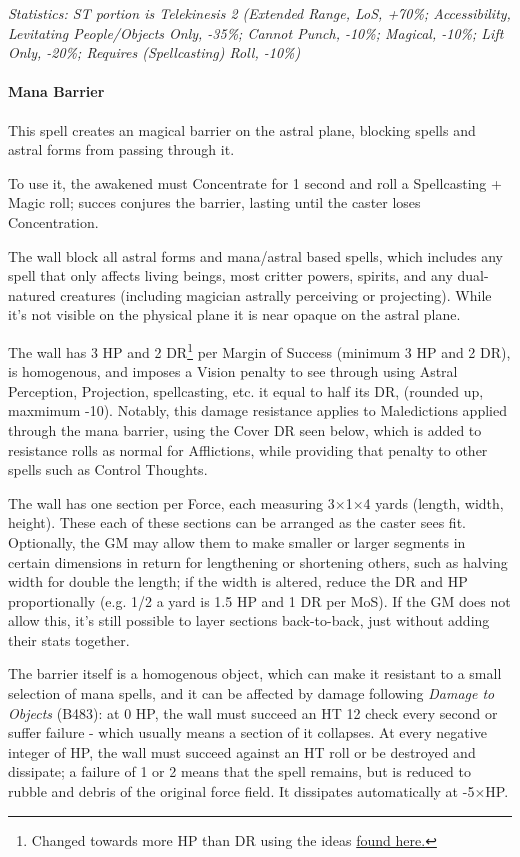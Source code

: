 \begin{multicols*}{3}
	\textcolor{OliveGreen}{\textit{Statistics: ST portion is Telekinesis 2 (Extended Range, LoS, +70\%; Accessibility, Levitating People/Objects Only, -35\%; Cannot Punch, -10\%; Magical, -10\%; Lift Only, -20\%; Requires (Spellcasting) Roll, -10\%) }}
	
	\paragraph{Mana Barrier}
	
	This spell creates an magical barrier on the astral plane, blocking spells and astral forms from passing through it.
	
	To use it, the awakened must Concentrate for 1 second and roll a Spellcasting + Magic roll; succes conjures the barrier, lasting until the caster loses Concentration.
	
	The wall block all astral forms and mana/astral based spells, which includes any spell that only affects living beings,  most critter powers, spirits, and any dual-natured creatures (including magician astrally perceiving or projecting). While it's not visible on the physical plane it is near opaque on the astral plane.
	
	The wall has 3 HP and 2 DR\footnote{Changed towards more HP than DR using the ideas \textcolor{Blue}{\href{http://forums.sjgames.com/showpost.php?p=2050064&postcount=3}{found here.}}} per Margin of Success (minimum 3 HP and 2 DR), is homogenous, and imposes a Vision penalty to see through using Astral Perception, Projection, spellcasting, etc. it equal to half its DR, (rounded up, maxmimum -10). Notably, this damage resistance applies to Maledictions applied through the mana barrier, using the Cover DR seen below, which is added to resistance rolls as normal for Afflictions, while providing that penalty to other spells such as Control Thoughts.
	
	The wall has one section per Force, each measuring 3$\times$1$\times$4 yards (length, width, height). These each of these sections can be arranged as the caster sees fit. Optionally, the GM may allow them to make smaller or larger segments in certain dimensions in return for lengthening or shortening others, such as halving width for double the length; if the width is altered, reduce the DR and HP proportionally (e.g. 1/2 a yard is 1.5 HP and 1 DR per MoS). If the GM does not allow this, it's still possible to layer sections back-to-back, just without adding their stats together.
	
	The barrier itself is a homogenous object, which can make it resistant to a small selection of mana spells, and it can be affected by damage following \textit{Damage to Objects} (B483): at 0 HP, the wall must succeed an HT 12 check every second or suffer failure - which usually means a section of it collapses. At every negative integer of HP, the wall must succeed against an HT roll or be destroyed and dissipate; a failure of 1 or 2 means that the spell remains, but is reduced to rubble and debris of the original force field. It dissipates automatically at -5$\times$HP.
	

\end{multicols*}
